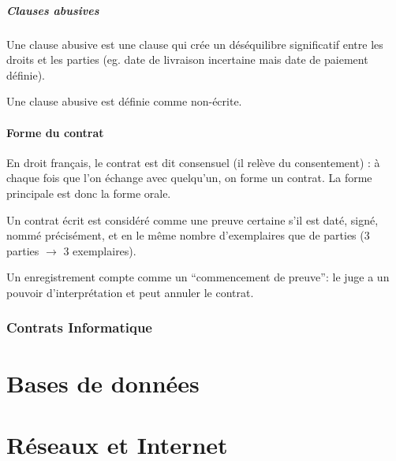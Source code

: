 \documentclass[10pt,a4paper,french]{article}
\begin{document}
\subsubsection{Clauses abusives}
Une clause abusive est une clause qui crée un déséquilibre significatif entre les droits et les parties (eg. date de livraison incertaine mais date de paiement définie).

Une clause abusive est définie comme non-écrite.

\subsection{Forme du contrat}
En droit français, le contrat est dit consensuel (il relève du consentement) : à chaque fois que l'on échange avec quelqu'un, on forme un contrat. La forme principale est donc la forme orale.

Un contrat écrit est considéré comme une preuve certaine s'il est daté, signé, nommé précisément, et en le même nombre d'exemplaires que de parties (3 parties $\to$ 3 exemplaires).

Un enregistrement compte comme un ``commencement de preuve'': le juge a un pouvoir d'interprétation et peut annuler le contrat.

\section{Contrats Informatique}

\part{Bases de données}

\part{Réseaux et Internet}

\appendix %

\end{document}
